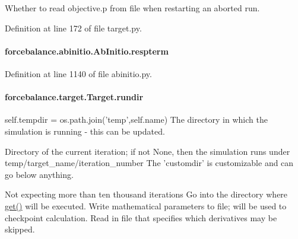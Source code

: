 Whether to read objective.\-p from file when restarting an aborted run. 



Definition at line 172 of file target.\-py.

\hypertarget{classforcebalance_1_1abinitio_1_1AbInitio_a689e3849518b33539442a473a41ed32d}{
\paragraph[{respterm}]{\setlength{\rightskip}{0pt plus 5cm}forcebalance.\-abinitio.\-Ab\-Initio.\-respterm\hspace{0.3cm}{\ttfamily [inherited]}}}\label{classforcebalance_1_1abinitio_1_1AbInitio_a689e3849518b33539442a473a41ed32d}


Definition at line 1140 of file abinitio.\-py.

\hypertarget{classforcebalance_1_1target_1_1Target_a6872de5b2d4273b82336ea5b0da29c9e}{
\paragraph[{rundir}]{\setlength{\rightskip}{0pt plus 5cm}forcebalance.\-target.\-Target.\-rundir\hspace{0.3cm}{\ttfamily [inherited]}}}\label{classforcebalance_1_1target_1_1Target_a6872de5b2d4273b82336ea5b0da29c9e}


self.\-tempdir = os.\-path.\-join('temp',self.\-name) The directory in which the simulation is running -\/ this can be updated. 

Directory of the current iteration; if not None, then the simulation runs under temp/target\-\_\-name/iteration\-\_\-number The 'customdir' is customizable and can go below anything.

Not expecting more than ten thousand iterations Go into the directory where \hyperlink{classforcebalance_1_1target_1_1Target_a1389888302c49d529716cb45b13a6f5a}{get()} will be executed. Write mathematical parameters to file; will be used to checkpoint calculation. Read in file that specifies which derivatives may be skipped. 

